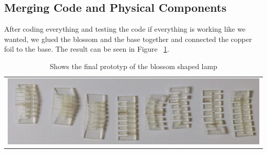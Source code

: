 \documentclass[doc.tex]{subfiles}
\begin{document}
    \subsection{Merging Code and Physical Components}
        \begin{flushleft}
            After coding everything and testing the code if everything is working like we wanted, we glued
            the blossom and the base together and connected the copper foil to the base. The result can be 
            seen in Figure ~\ref{fig:finalPrototyp}.
        \end{flushleft}

        \begin{table}[h!]
            \centering
            \begin{tabular}{c}
              \centering
              \includegraphics[width=.8\linewidth]{images/process/01_LaserCut.jpg}
            \end{tabular}
            \caption{Shows the final prototyp of the blossom shaped lamp}
            \label{fig:finalPrototyp}
        \end{table}
\end{document}
